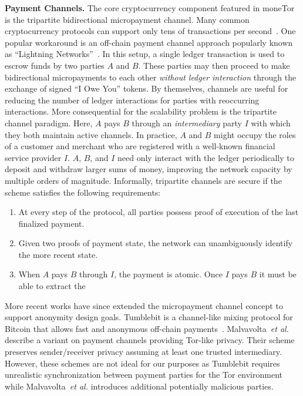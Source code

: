\medskip \noindent\textbf{Payment Channels.}
The core cryptocurrency component featured in moneTor is the tripartite bidirectional micropayment channel.
Many common cryptocurrency protocols can support only tens of transactions per second~\cite{team2018blockchain}.
One popular workaround is an off-chain payment channel approach popularly known as ``Lightning Networks''~\cite{poon2016bitcoin}.
In this setup, a single ledger transaction is used to escrow funds by two parties $A$ and $B$.
These parties may then proceed to make bidirectional micropayments to each other \emph{without ledger interaction} through the exchange of signed ``I Owe You'' tokens.
By themselves, channels are useful for reducing the number of ledger interactions for parties with reoccurring interactions.
More consequential for the scalability problem is the tripartite channel paradigm.
Here, $A$ pays $B$ through an \emph{intermediary} party $I$ with which they both maintain active channels.
In practice, $A$ and $B$ might occupy the roles of a customer and merchant who are registered with a well-known financial service provider $I$.
$A$, $B$, and $I$ need only interact with the ledger periodically to deposit and withdraw larger sums of money, improving the network capacity by multiple orders of magnitude.
Informally, tripartite channels are secure if the scheme satisfies the following requirements:

\begin{enumerate}
\item At every step of the protocol, all parties possess proof of execution of the last finalized payment.
\item Given two proofs of payment state, the network can unambiguously identify the more recent state.
\item When $A$ pays $B$ through $I$, the payment is atomic.
  Once $I$ pays $B$ it must be able to extract the
\end{enumerate}

More recent works have since extended the micropayment channel concept to support anonymity design goals.
Tumblebit is a channel-like mixing protocol for Bitcoin that allows fast and anonymous off-chain payments~\cite{heilman2017tumblebit}.
Malvavolta~\textit{et al.}~\cite{malavolta2017concurrency} describe a variant on payment channels providing Tor-like privacy.
Their scheme preserves sender/receiver privacy assuming at least one trusted intermediary.
However, these schemes are not ideal for our purposes as Tumblebit requires unrealistic synchronization between payment parties for the Tor environment while Malvavolta~\textit{et al.}
introduces additional potentially malicious parties.

